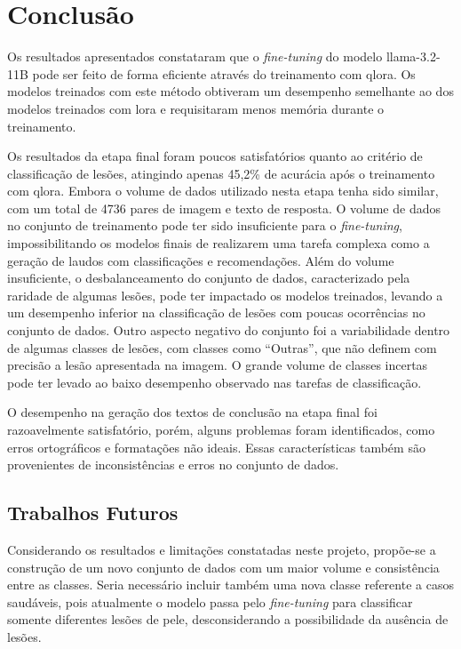 \section{Conclusão}

Os resultados apresentados constataram que o \textit{fine-tuning} do modelo \ac{llama}-3.2-11B pode ser feito de forma
eficiente através do treinamento com \ac{qlora}. Os modelos treinados com este método obtiveram um desempenho
semelhante ao dos modelos treinados com \ac{lora} e requisitaram menos memória durante o treinamento.

Os resultados da etapa final foram poucos satisfatórios quanto ao critério de classificação de lesões, atingindo
apenas 45,2\% de acurácia após o treinamento com \ac{qlora}. Embora o volume de dados utilizado nesta etapa tenha sido
similar, com um total de 4736 pares de imagem e texto de resposta. O volume de dados no conjunto de treinamento pode
ter sido insuficiente para o \textit{fine-tuning}, impossibilitando os modelos finais de realizarem uma tarefa complexa
como a geração de laudos com classificações e recomendações. Além do volume insuficiente, o desbalanceamento do
conjunto de dados, caracterizado pela raridade de algumas lesões, pode ter impactado os modelos treinados, levando a um
desempenho inferior na classificação de lesões com poucas ocorrências no conjunto de dados. Outro aspecto negativo do
conjunto foi a variabilidade dentro de algumas classes de lesões, com classes como ``Outras'', que não definem com
precisão a lesão apresentada na imagem. O grande volume de classes incertas pode ter levado ao baixo desempenho
observado nas tarefas de classificação.

O desempenho na geração dos textos de conclusão na etapa final foi razoavelmente satisfatório, porém, alguns problemas
foram identificados, como erros ortográficos e formatações não ideais. Essas características também são provenientes de
inconsistências e erros no conjunto de dados.

\subsection{Trabalhos Futuros}

Considerando os resultados e limitações constatadas neste projeto, propõe-se a construção de um novo conjunto de dados
com um maior volume e consistência entre as classes. Seria necessário incluir também uma nova classe referente a casos
saudáveis, pois atualmente o modelo passa pelo \textit{fine-tuning} para classificar somente diferentes lesões de pele,
desconsiderando a possibilidade da ausência de lesões.

